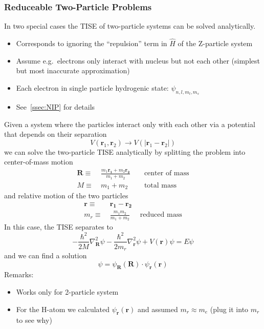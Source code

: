\subsubsection{Reduceable Two-Particle Problems}
In two special cases the TISE of two-particle systems can be solved analytically.

\newpar{}

\begin{itemize}
    \item Corresponds to ignoring the ``repulsion'' term in $\widehat{H}$ of the Z-particle system
    \item Assume e.g.\ electrons only interact with nucleus but not each other (simplest but most inaccurate approximation)
    \item Each electron in single particle hydrogenic state: $\psi_{n,l,m_l,m_s}$
    \item See~\ref{ssec:NIP} for details
\end{itemize}

\newpar{}

Given a system where the particles interact only with each other via a potential that depends on their separation
\begin{equation*}
    V(\mathbf{r}_1,\mathbf{r}_2)\to V(|\mathbf{r}_1-\mathbf{r}_2|)
\end{equation*}
we can solve the two-particle TISE analytically by splitting the problem into center-of-mass motion
\begin{align*}
    \mathbf{R}\equiv\  & \frac{m_1\mathbf{r_1}+m_2\mathbf{r_2}}{m_1+m_2} &  & \text{ center of mass} \\
    M\equiv\           & m_1 + m_2                                       &  & \text{ total mass}
\end{align*}
and relative motion of the two particles
\begin{align*}
    \mathbf{r}\equiv\  & \mathbf{r_1}-\mathbf{r_2} &                      \\
    m_r\equiv\         & \frac{m_1 m_2}{m_1+m_2}   & \text{ reduced mass}
\end{align*}
In this case, the TISE separates to
\begin{equation*}
    -\frac{\hbar^{2}}{2M}\nabla_{\mathbf{R}}^{2}\psi-\frac{\hbar^{2}}{2m_r}\nabla_{\mathbf{r}}^{2}\psi+V(\mathbf{r})\psi=E\psi
\end{equation*}
and we can find a solution
\begin{equation*}
    \psi = \psi_\mathbf{R}(\mathbf{R})\cdot\psi_\mathbf{r}(\mathbf{r})
\end{equation*}
Remarks:
\begin{itemize}
    \item Works only for 2-particle system
    \item For the H-atom we calculated $\psi_\mathbf{r}(\mathbf{r})$ and assumed $m_r\approx m_e$ (plug it into $m_r$ to see why)
\end{itemize}

